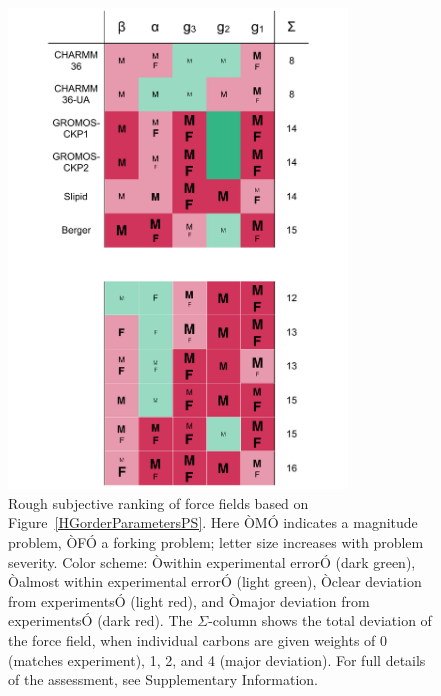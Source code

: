 \documentclass[aps,prl,superscriptaddress,twocolumn]{revtex4}
\begin{document}
\begin{figure}[]
  \centering
  \includegraphics[width=9.0cm]{../Figs/comparisonTablePS.pdf}
  \caption{\label{comparisonTablePS}
  Rough subjective ranking of force fields based on Figure~\ref{HGorderParametersPS}. Here ÒMÓ indicates a magnitude problem, ÒFÓ a forking problem; letter size increases with problem severity. Color scheme: Òwithin experimental errorÓ (dark green), Òalmost within experimental errorÓ (light green), Òclear deviation from experimentsÓ (light red), and Òmajor deviation from experimentsÓ (dark red). The $\Sigma$-column shows the total deviation of the force field, when individual carbons are given weights of 0 (matches experiment), 1, 2, and 4 (major deviation). For full details of the assessment, see Supplementary Information.
  }
\end{figure}
\end{document}
